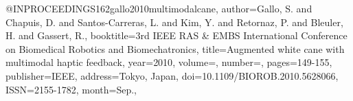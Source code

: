 @INPROCEEDINGS{162gallo2010multimodalcane,
author={Gallo, S. and Chapuis, D. and Santos-Carreras, L. and Kim, Y. and Retornaz, P. and Bleuler, H. and Gassert, R.},
booktitle={3rd IEEE RAS \& EMBS International Conference on Biomedical Robotics and Biomechatronics}, 
title={Augmented white cane with multimodal haptic feedback}, 
year={2010},
volume={},
number={},
pages={149-155},
publisher={IEEE},
address={Tokyo, Japan},
doi={10.1109/BIOROB.2010.5628066},
ISSN={2155-1782},
month={Sep.},}
